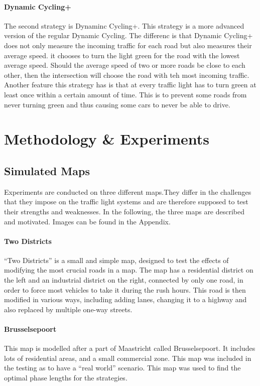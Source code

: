 \documentclass[11pt]{article}
\begin{document}
\paragraph{Dynamic Cycling+} The second strategy is Dynaminc Cycling+. This strategy is a more advanced version of the regular Dynamic Cycling. The differenc is that Dynamic Cycling+ does not only measure the incoming traffic for each road but also measures their average speed. it chooses to turn the light green for the road with the lowest average speed. Should the average speed of two or more roads be close to each other, then the intersection will choose the road with teh most incoming traffic. Another feature this strategy has is that at every traffic light has to turn green at least once within a certain amount of time. This is to prevent some roads from never turning green and thus causing some cars to never be able to drive.

\section{Methodology \& Experiments}
\label{sec:experiments}

\subsection{Simulated Maps}
Experiments are conducted on three different maps.They differ in the challenges that they impose on the traffic light systems and are therefore supposed to test their strengths and weaknesses. In the following, the three maps are described and motivated. Images can be found in the Appendix.

\paragraph{Two Districts} “Two Districts” is a small and simple map, designed to test the effects of modifying the most crucial roads in a map. The map has a residential district on the left and an industrial district on the right, connected by only one road, in order to force most vehicles to take it during the rush hours. This road is then modified in various ways, including adding lanes, changing it to a highway and also replaced by multiple one-way streets. 

\paragraph{Brusselsepoort} This map is modelled after a part of Maastricht called Brusselsepoort. It includes lots of residential areas, and a small commercial zone. This map was included in the testing as to have a “real world” scenario. This map was used to find the optimal phase lengths for the strategies.
\end{document}

